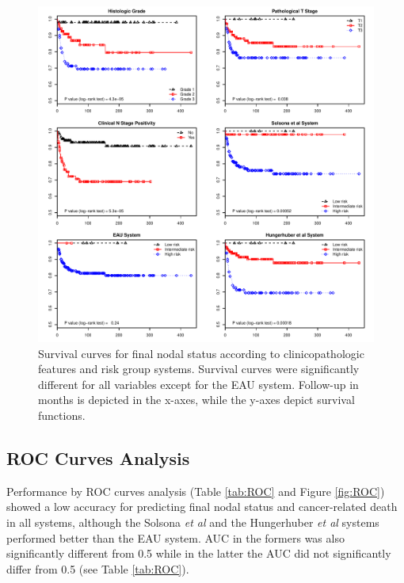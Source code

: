 \documentclass[11pt,letterpaper]{article}\usepackage[]{graphicx}\usepackage[]{color}
\makeatletter
\def\maxwidth{ %
  \ifdim\Gin@nat@width>\linewidth
    \linewidth
  \else
    \Gin@nat@width
  \fi
}
\newenvironment{knitrout}{}{} %
\makeatother
\begin{document}
\begin{multicols}{2}
\begin{figure}
\centering
\begin{knitrout}
\color{fgcolor}
\includegraphics[width=\maxwidth]{figure/Survival_DOD-1} 

\end{knitrout}
        \caption{Survival curves for final nodal status according to clinicopathologic features and risk group systems. Survival curves were significantly different for all variables except for the EAU system. Follow-up in months is depicted in the x-axes, while the y-axes depict survival functions.}
        \label{fig:Survival_DOD}
\end{figure}

\subsection*{ROC Curves Analysis}
Performance by ROC curves analysis (Table \ref{tab:ROC} and Figure \ref{fig:ROC}) showed a low accuracy for predicting final nodal status and cancer-related death in all systems, although the Solsona \emph{et al} and the Hungerhuber \emph{et al} systems performed better than the EAU system. AUC in the formers was also significantly different from 0.5 while in the latter the AUC did not significantly differ from 0.5 (see Table \ref{tab:ROC}).


\end{multicols}
\end{document}
